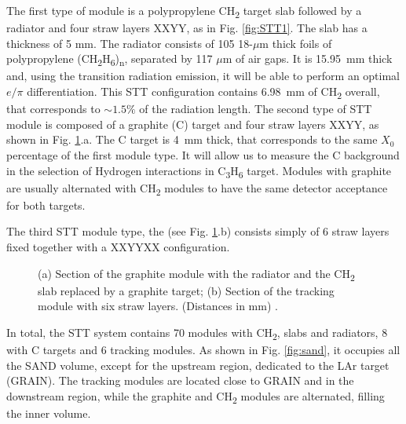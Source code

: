 The first type of module is a polypropylene CH\textsubscript{2} target slab followed by a radiator and four straw layers XXYY, as in Fig. \ref{fig:STT1}. The slab has a thickness of 5 mm. The radiator consists of 105 18-$\mu$m thick foils of polypropylene (CH\textsubscript{2}H\textsubscript{6})\textsubscript{n}, separated by 117 $\mu$m of air gaps. It is 15.95~mm thick and, using the transition radiation emission, it will be able to perform an optimal $e/\pi$ differentiation. This STT configuration contains 6.98~mm of CH\textsubscript{2} overall, that corresponds to $\sim 1.5\%$ of the radiation length.
The second type of STT module is composed of a graphite (C) target and four straw layers XXYY, as shown in Fig. \ref{fig:stt2-3}.a. The C target is 4~mm thick, that corresponds to the same $X_0$ percentage of the first module type. It will allow us to measure the C background in the selection of Hydrogen interactions in C\textsubscript{3}H\textsubscript{6} target. Modules with graphite are usually alternated with CH\textsubscript{2} modules to have the same detector acceptance for both targets.

The third STT module type, the  (see Fig. \ref{fig:stt2-3}.b) consists simply of 6 straw layers fixed together with a XXYYXX configuration. 

\begin{figure}
    \centering
    \caption{(a) Section of the graphite module with the radiator and the CH\textsubscript{2} slab replaced by a graphite target; (b) Section of the tracking module with six straw layers. (Distances in mm) \cite{tesi-cicero}.}
    \label{fig:stt2-3}
\end{figure}

In total, the STT system contains 70 modules with CH\textsubscript{2}, slabs and radiators, 8 with C targets and 6 tracking modules. As shown in Fig. \ref{fig:sand}, it occupies all the SAND volume, except for the upstream region, dedicated to the LAr target (GRAIN). The tracking modules are located close to GRAIN and in the downstream region, while the graphite and CH\textsubscript{2} modules are alternated, filling the inner volume.

